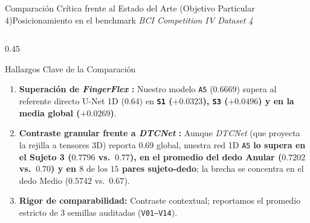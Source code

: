 \begin{frame}{Comparaci\'on Cr\'itica frente al Estado del Arte (Objetivo Particular 4)}{Posicionamiento en el benchmark \textit{BCI Competition IV Dataset 4} \cite{liang2012decoding,Lomtev2022,wang2025dtcnet,rodas_valencia_tpe_ecog}}
\begin{columns}[T,onlytextwidth]
    \begin{column}{0.45\textwidth}
      \scriptsize
      \begin{block}{Hallazgos Clave de la Comparaci\'on}
        \begin{enumerate}\setlength{\itemsep}{2.5pt}
          \item \textbf{Superaci\'on de \textit{FingerFlex} \cite{Lomtev2022}:} Nuestro modelo \texttt{A5} ($0.6669$) supera al referente directo U-Net 1D ($0.64$) en \textbf{\texttt{S1} ($+0.0323$), \texttt{S3} ($+0.0496$) y en la media global ($\mathbf{+0.0269}$)}.
          \item \textbf{Contraste granular frente a \textit{DTCNet} \cite{wang2025dtcnet}:} Aunque \textit{DTCNet} (que proyecta la rejilla a tensores 3D) reporta $0.69$ global, nuestra red 1D \texttt{A5} \textbf{lo supera en el Sujeto 3 ($0.7796$ vs.\ $0.77$), en el promedio del dedo Anular ($0.7202$ vs.\ $0.70$) y en $8\text{ de los }15$ pares sujeto-dedo}; la brecha se concentra en el dedo Medio ($0.5742$ vs.\ $0.67$).
          \item \textbf{Rigor de comparabilidad:} Contraste contextual; reportamos el promedio estricto de 3 semillas auditadas (\texttt{V01--V14}).
        \end{enumerate}
      \end{block}
    \end{column}
  \end{columns}
\end{frame}
